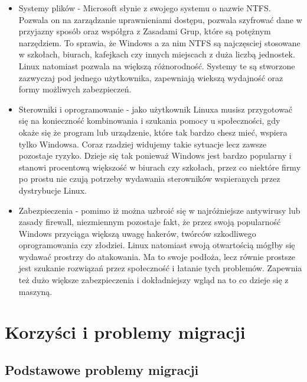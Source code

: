 \documentclass[10pt,a4paper]{report}
\begin{document}
\begin{itemize}
\begin{itemize}
\end{itemize}
\item Systemy plików - Microsoft słynie z swojego systemu o nazwie NTFS. Pozwala on na zarządzanie uprawnieniami dostępu, pozwala szyfrować dane w przyjazny sposób oraz współgra z Zasadami Grup, które są potężnym narzędziem. To sprawia, że Windows a za nim NTFS są najczęsciej stosowane w szkołach, biurach, kafejkach czy innych miejscach z duża liczbą jednostek. Linux natomiast pozwala na większą różnorodność. Systemy te są stworzone zazwyczaj pod jednego użytkownika, zapewniają wiekszą wydajność oraz formy możliwych zabezpieczeń.
\item Sterowniki i oprogramowanie - jako użytkownik Linuxa musisz przygotować się na konieczność kombinowania i szukania pomocy u społeczności, gdy okaże się że program lub urządzenie, które tak bardzo chesz mieć, wspiera tylko Windowsa. Coraz rzadziej widujemy takie sytuacje lecz zawsze pozostaje ryzyko. Dzieje się tak ponieważ Windows jest bardzo popularny i stanowi procentową większość w biurach czy szkołach, przez co niektóre firmy po prostu nie czują potrzeby wydawania sterowników wspieranych przez dystrybucje Linux.
\item Zabezpieczenia - pomimo iż można uzbroić się w najróżniejsze antywirusy lub zasady firewall, niezmiennym pozostaje fakt, że przez swoją popularność Windows przyciąga większą uwagę hakerów, twórców szkodliwego oprogramowania czy złodziei. Linux natomiast swoją otwartością mógłby się wydawać prostrzy do atakowania. Ma to swoje podłoża, lecz równie prostsze jest szukanie rozwiązań przez społeczność i łatanie tych problemów. Zapewnia też dużo większe zabezpieczenia i dokładniejszy wgląd na to co dzieje się z maszyną.
\end{itemize}
	
\chapter{Korzyści i problemy migracji}

	\section{Podstawowe problemy migracji}
	
\end{document}

